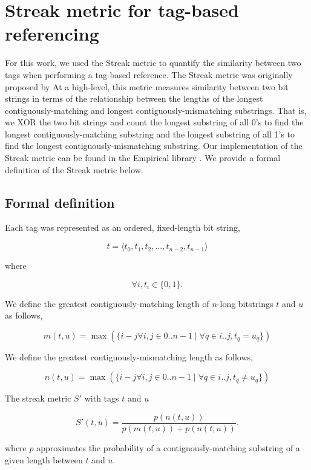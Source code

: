 \documentclass[]{book}
\begin{document}
\hypertarget{streak-metric-for-tag-based-referencing}{%
\chapter{Streak metric for tag-based referencing}\label{streak-metric-for-tag-based-referencing}}

For this work, we used the Streak metric to quantify the similarity between two tags when performing
a tag-based reference.
The Streak metric was originally proposed by \citep{downing_intelligence_2015}
At a high-level, this metric measures similarity between two bit strings in terms of the relationship between the lengths of the longest contiguously-matching and longest contiguously-mismatching substrings.
That is, we XOR the two bit strings and count the longest substring of all 0's to find the longest contiguously-matching substring and the longest substring of all 1's to find the longest contiguously-mismatching substring.
Our implementation of the Streak metric can be found in the Empirical library \citep{charles_ofria_2020_empirical}.
We provide a formal definition of the Streak metric below.

\hypertarget{formal-definition}{%
\section{Formal definition}\label{formal-definition}}

Each tag was represented as an ordered, fixed-length bit string,

\[ t = \langle t_0, t_1, t_2, \dots, t_{n-2}, t_{n-1} \rangle \]

where

\[ \forall i, t_i \in \{0, 1\}. \]

We define the greatest contiguously-matching length of \(n\)-long bitstrings \(t\) and \(u\) as follows,

\[ m(t, u) = \max(\{i - j \forall i, j \in 0..n-1 \mid \forall q \in i..j, t_q = u_q \}) \]

We define the greatest contiguously-mismatching length as follows,

\[ n(t, u) = \max(\{i - j \forall i, j \in 0..n-1 \mid \forall q \in i..j, t_q \neq u_q \}) \]

The streak metric \(S'\) with tags \(t\) and \(u\)

\[
S'(t, u)
= \frac{ p(n(t,u)) }{p(m(t,u)) + p(n(t,u))}.
\]

where \(p\) approximates the probability of a contiguously-matching substring of a given length between \(t\) and \(u\).
\end{document}
